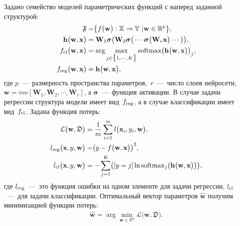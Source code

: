 Задано семейство моделей параметрических функций с наперед заданной структурой:
\begin{equation}
\label{eq:st:2}
\begin{aligned}
\mathfrak{F} &= \bigr\{f\bigr(\textbf{w}\bigr):\mathbb{X} \to \mathbb{Y}~| \textbf{w} \in \mathbb{R}^{p}\bigr\}, \\ 
\mathbf{h}\bigr(\textbf{w}, \textbf{x}\bigr) &= \textbf{W}_1\bm{\sigma}\bigr(\textbf{W}_2\bm{\sigma}\bigr(\cdots\bm{\sigma}\bigr(\textbf{W}_r\textbf{x}\bigr)\cdots\bigr)\bigr),\\
f_{\text{\text{cl}}}\bigr(\textbf{w}, \textbf{x}\bigr) &= \arg \max_{j \in \bigr\{1,\cdots, K\bigr\}} \text{softmax}\bigr(\mathbf{h}\bigr(\textbf{w}, \textbf{x}\bigr)\bigr)_{j}, \\ 
f_{\text{reg}}\bigr(\textbf{w}, \textbf{x}\bigr) & = \mathbf{h}\bigr(\textbf{w}, \textbf{x}\bigr), 
\end{aligned}
\end{equation}
где $p$~---~размерность пространства параметров,~$r$~---~число слоев нейросети,~$\textbf{w} = \text{vec}[\textbf{W}_1, \textbf{W}_2, \cdots, \textbf{W}_r]$, а $\bm{\sigma}$~---~функция активации. В случае задачи регрессии структура модели имеет вид~$f_{\text{\text{reg}}}$, а в случае классификации имеет вид~$f_{\text{\text{cl}}}$.
Задана функция потерь:
\begin{equation}
\label{eq:st:3}
\begin{aligned}
\mathcal{L}\bigr(\textbf{w}, \mathfrak{D}\bigr) &= \frac{1}{m}\sum_{i=1}^{m}l\bigr(\textbf{x}_{i}, y_i, \textbf{w}\bigr),\\
l_{\text{\text{reg}}}\bigr(\textbf{x}, y, \textbf{w}\bigr) &= \bigr(y - f\bigr(\textbf{w}, \textbf{x}\bigr)\bigr)^{2},\\
l_{\text{\text{cl}}}\bigr(\textbf{x}, y, \textbf{w}\bigr) &= -\sum_{j=1}^{K}\bigr([y = j]\ln\text{softmax}_j\bigr(\mathbf{h}\bigr(\textbf{w}, \textbf{x}\bigr)\bigr)\bigr),
\end{aligned}
\end{equation}
где $l_{\text{\text{reg}}}$~---~это функция ошибки на одном элементе для задачи регрессии, $l_{\text{\text{cl}}}$~---~для задачи классификации.
Оптимальный вектор параметров $\hat{\textbf{w}}$ получим минимизацией функции потерь:
\begin{equation}
\label{eq:st:0:1}
\begin{aligned}
\hat{\textbf{w}} = \arg \min_{\textbf{w}\in\mathbb{R}^{p}} \mathcal{L}\bigr(\textbf{w}, \mathfrak{D}\bigr).
\end{aligned}
\end{equation}


